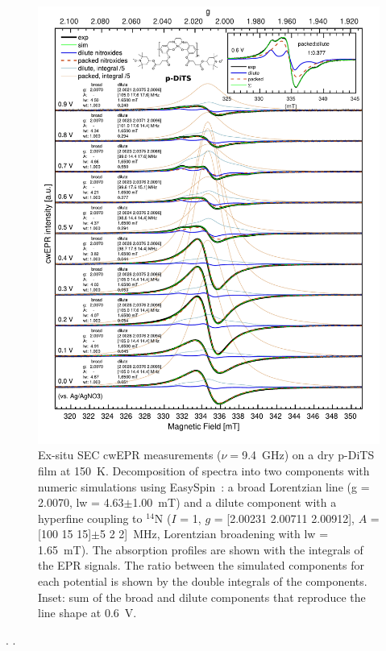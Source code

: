 \begin{figure}[h]
\center
	\includegraphics[width=1\textwidth]{./operando_epr/figures/CRYO/Figure_S7_new.pdf}
	\caption{Ex-situ SEC cwEPR measurements ($\nu=$9.4~GHz) on a dry p-DiTS film at 150~K. Decomposition of spectra into two components with numeric simulations using EasySpin~\cite{Stoll_2006}: a broad Lorentzian line (g = 2.0070, lw = 4.63$\pm$1.00~mT) and a dilute component with a hyperfine coupling to $^{14}$N ($I$ = 1, $g$ = [2.00231 2.00711 2.00912], $A$ = [100 15 15]$\pm$5 2 2]~MHz, Lorentzian broadening with lw = 1.65~mT). The absorption profiles are shown with the integrals of the EPR signals. The ratio between the simulated components for each potential is shown by the double integrals of the components. Inset: sum of the broad and dilute components that reproduce the line shape at 0.6~V.\\}
	\label{fig:cwEPR_CRYO_DiTS_CHG_SIM}
\end{figure}

\newpage
.
\newpage
.
\newpage

